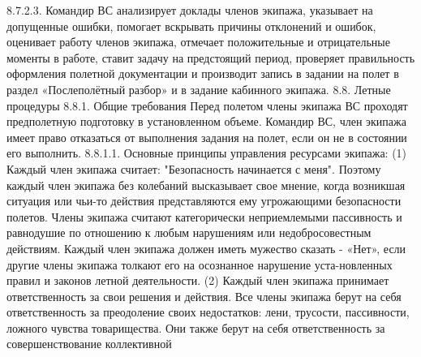 8.7.2.3. Командир ВС анализирует доклады членов экипажа, указывает на допущенные ошибки, помогает вскрывать причины отклонений и ошибок, оценивает работу членов экипажа, отмечает положительные и отрицательные моменты в работе, ставит задачу на предстоящий период, проверяет правильность оформления полетной документации и производит запись в задании на полет в раздел «Послеполётный разбор» и в задание кабинного экипажа.
8.8. Летные процедуры
8.8.1. Общие требования
Перед полетом члены экипажа ВС проходят предполетную подготовку в установленном объеме.
Командир ВС, член экипажа имеет право отказаться от выполнения задания на полет, если он не в состоянии его выполнить.
8.8.1.1. Основные принципы управления ресурсами экипажа:
(1) Каждый член экипажа считает: "Безопасность начинается с меня". Поэтому каждый член экипажа без колебаний высказывает свое мнение, когда возникшая ситуация или чьи-то действия представляются ему угрожающими безопасности полетов. Члены экипажа считают категорически неприемлемыми пассивность и равнодушие по отношению к любым нарушениям или недобросовестным действиям. Каждый член экипажа должен иметь мужество сказать - «Нет», если другие члены экипажа толкают его на осознанное нарушение уста-новленных правил и законов летной деятельности.
(2) Каждый член экипажа принимает ответственность за свои решения и действия. Все члены экипажа берут на себя ответственность за преодоление своих недостатков: лени, трусости, пассивности, ложного чувства товарищества. Они также берут на себя ответственность за совершенствование коллективной

